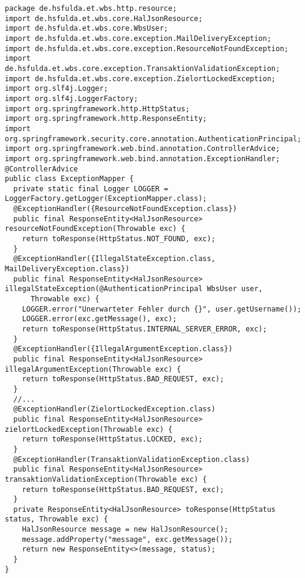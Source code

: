 \begin{lstlisting}[caption={Modul für die allgemeine Verarbeitung von Ausnahmen.}, label={lst:ExceptionMapper}]
package de.hsfulda.et.wbs.http.resource;
import de.hsfulda.et.wbs.core.HalJsonResource;
import de.hsfulda.et.wbs.core.WbsUser;
import de.hsfulda.et.wbs.core.exception.MailDeliveryException;
import de.hsfulda.et.wbs.core.exception.ResourceNotFoundException;
import de.hsfulda.et.wbs.core.exception.TransaktionValidationException;
import de.hsfulda.et.wbs.core.exception.ZielortLockedException;
import org.slf4j.Logger;
import org.slf4j.LoggerFactory;
import org.springframework.http.HttpStatus;
import org.springframework.http.ResponseEntity;
import org.springframework.security.core.annotation.AuthenticationPrincipal;
import org.springframework.web.bind.annotation.ControllerAdvice;
import org.springframework.web.bind.annotation.ExceptionHandler;
@ControllerAdvice
public class ExceptionMapper {
  private static final Logger LOGGER = LoggerFactory.getLogger(ExceptionMapper.class);
  @ExceptionHandler({ResourceNotFoundException.class})
  public final ResponseEntity<HalJsonResource> resourceNotFoundException(Throwable exc) {
    return toResponse(HttpStatus.NOT_FOUND, exc);
  }
  @ExceptionHandler({IllegalStateException.class, MailDeliveryException.class})
  public final ResponseEntity<HalJsonResource> illegalStateException(@AuthenticationPrincipal WbsUser user,
      Throwable exc) {
    LOGGER.error("Unerwarteter Fehler durch {}", user.getUsername());
    LOGGER.error(exc.getMessage(), exc);
    return toResponse(HttpStatus.INTERNAL_SERVER_ERROR, exc);
  }
  @ExceptionHandler({IllegalArgumentException.class})
  public final ResponseEntity<HalJsonResource> illegalArgumentException(Throwable exc) {
    return toResponse(HttpStatus.BAD_REQUEST, exc);
  }
  //...
  @ExceptionHandler(ZielortLockedException.class)
  public final ResponseEntity<HalJsonResource> zielortLockedException(Throwable exc) {
    return toResponse(HttpStatus.LOCKED, exc);
  }
  @ExceptionHandler(TransaktionValidationException.class)
  public final ResponseEntity<HalJsonResource> transaktionValidationException(Throwable exc) {
    return toResponse(HttpStatus.BAD_REQUEST, exc);
  }
  private ResponseEntity<HalJsonResource> toResponse(HttpStatus status, Throwable exc) {
    HalJsonResource message = new HalJsonResource();
    message.addProperty("message", exc.getMessage());
    return new ResponseEntity<>(message, status);
  }
}
\end{lstlisting}


